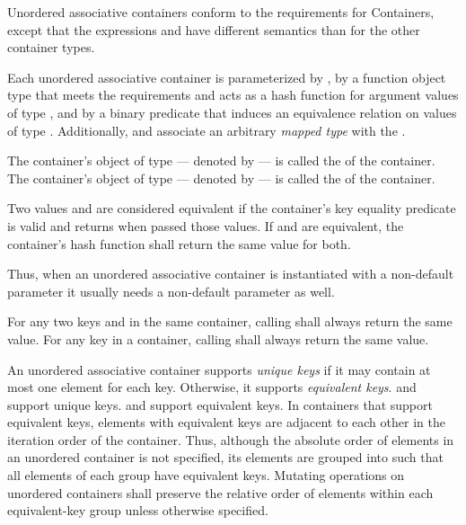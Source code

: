 \pnum
{}%
%
%
Unordered associative containers conform to the requirements for
Containers, except that
the expressions
 and  have different semantics than for the other
container types.

\pnum
Each unordered associative container is parameterized by ,
by a function object type  that meets the 
requirements and acts as a hash function for
argument values of type , and by a binary predicate 
that induces an equivalence relation on values of type .
Additionally,  and  associate
an arbitrary \textit{mapped type}  with the .

\pnum
{}%
%
The container's object of type  --- denoted by
 --- is called the  of the
container. The container's object of type  ---
denoted by  --- is called the
 of the container.

\pnum
{}%
Two values  and  are
considered equivalent if the container's
key equality predicate
 is valid and returns
 when passed those values.  If  and
 are equivalent, the container's hash function shall
return the same value for both.
\begin{note}
Thus, when an unordered associative container is instantiated with
a non-default  parameter it usually needs a non-default 
parameter as well.
\end{note}
For any two keys  and  in the same container,
calling  shall always return the same value.
For any key  in a container, calling 
shall always return the same value.

\pnum
{}%
%
An unordered associative container supports \textit{unique keys} if it
may contain at most one element for each key.  Otherwise, it supports
\textit{equivalent keys}.   and 
support unique keys.  and 
support equivalent keys.  In containers that support equivalent keys,
elements with equivalent keys are adjacent to each other
in the iteration order of the container. Thus, although the absolute order
of elements in an unordered container is not specified, its elements are
grouped into  such that all elements of each
group have equivalent keys. Mutating operations on unordered containers shall
preserve the relative order of elements within each equivalent-key group
unless otherwise specified.

